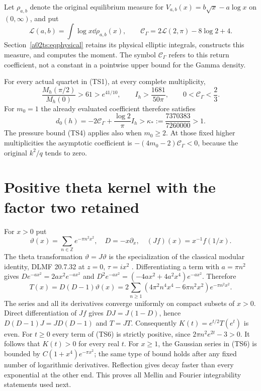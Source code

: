 Let $\rho_{a,b}$ denote the original equilibrium measure for
$V_{a,b}(x)=b\sqrt x-a\log x$ on $(0,\infty)$, and put
\begin{equation}\tag{TS3}
 \mathcal L(a,b)=\int\log x\dd\rho_{a,b}(x),\qquad
 \mathcal C_\Gamma=2\mathcal L(2,\pi)-8\log2+4.
\end{equation}
Section~\ref{a02ts:eqphysical} retains its physical elliptic integrals,
constructs this measure, and computes the moment. The symbol
$\mathcal C_\Gamma$ refers to this return coefficient, not a constant
in a pointwise upper bound for the Gamma density.

\begin{theorem}\label{a02ts:th:sign}
For every actual quartet in (TS1), at every complete multiplicity,
\begin{equation}\tag{TS4}
 \frac{M_h(\pi/2)}{M_h(0)}>61>e^{41/10},\qquad
 I_h>\frac{1681}{50\pi},\qquad 0<\mathcal C_\Gamma<\frac23.
\end{equation}
For $m_0=1$ the already evaluated coefficient therefore satisfies
\begin{equation}\tag{TS5}
 d_0(h)=-2\mathcal C_\Gamma+\frac{\log2}{\pi}I_h
 >\kappa_*:=\frac{7370383}{7260000}>1.
\end{equation}
The pressure bound (TS4) applies also when $m_0\geq2$.
At those fixed higher multiplicities the asymptotic coefficient is
$-(4m_0-2)\mathcal C_\Gamma<0$, because the original $k^2/q$ tends to zero.
\end{theorem}

\section{Positive theta kernel with the factor two retained}
For $x>0$ put
\[
 \vartheta(x)=\sum_{n\in\mathbb Z}e^{-\pi n^2x^2},\quad
 D=-x\partial_x,\quad (Jf)(x)=x^{-1}f(1/x).
\]
The theta transformation $\vartheta=J\vartheta$ is the specialization
of the classical modular identity, DLMF 20.7.32 at $z=0$,
$\tau=ix^2$ \cite{a02ts:theta}. Differentiating a term with $a=\pi n^2$
gives $D e^{-ax^2}=2ax^2e^{-ax^2}$ and
$D^2e^{-ax^2}=(-4ax^2+4a^2x^4)e^{-ax^2}$. Therefore
\begin{equation}\tag{TS6}
 T(x)=D(D-1)\vartheta(x)
 =2\sum_{n\geq1}(4\pi^2n^4x^4-6\pi n^2x^2)e^{-\pi n^2x^2}.
\end{equation}
The series and all its derivatives converge uniformly on compact
subsets of $x>0$. Direct differentiation of $Jf$ gives
$DJ=J(1-D)$, hence $D(D-1)J=JD(D-1)$ and $T=JT$.
Consequently $K(t)=e^{t/2}T(e^t)$ is even. For $t\geq0$ every term
of (TS6) is strictly positive, since $2\pi n^2e^{2t}-3>0$.
It follows that $K(t)>0$ for every real $t$. For $x\geq1$, the
Gaussian series in (TS6) is bounded by $C(1+x^4)e^{-\pi x^2}$;
the same type of bound holds after any fixed number of logarithmic
derivatives. Reflection gives decay faster than every exponential
at the other end. This proves all Mellin and Fourier integrability
statements used next.

